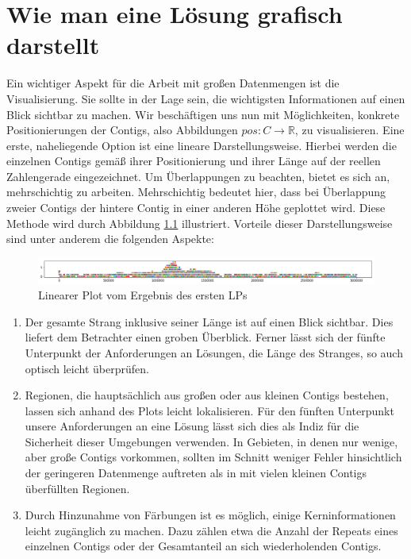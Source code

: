 \chapter{Wie man eine Lösung grafisch darstellt}
Ein wichtiger Aspekt für die Arbeit mit großen Datenmengen ist die Visualisierung.
Sie sollte in der Lage sein, die wichtigsten Informationen auf einen Blick sichtbar zu machen. Wir beschäftigen uns nun mit Möglichkeiten, konkrete Positionierungen der Contigs, also Abbildungen $pos: C \rightarrow \mathbb{R}$, zu visualisieren.
Eine erste, naheliegende Option ist eine lineare Darstellungsweise. Hierbei werden die einzelnen Contigs gemäß ihrer Positionierung und ihrer Länge auf der reellen Zahlengerade eingezeichnet. Um Überlappungen zu beachten, bietet es sich an, mehrschichtig zu arbeiten. Mehrschichtig bedeutet hier, dass bei Überlappung zweier Contigs der hintere Contig in einer anderen Höhe geplottet wird. Diese Methode wird durch Abbildung \ref{plot1} illustriert.
Vorteile dieser Darstellungsweise sind unter anderem die folgenden Aspekte:
\begin{figure}
	\begin{center}
		\includegraphics[width=17cm]{bilder/plot1}
	\end{center}
	\caption{Linearer Plot vom Ergebnis des ersten LPs}
	\label{plot1}
\end{figure}
\begin{enumerate}
	\item Der gesamte Strang inklusive seiner Länge ist auf einen Blick sichtbar. Dies liefert dem Betrachter einen groben Überblick. Ferner lässt sich der fünfte Unterpunkt der Anforderungen an Lösungen, die Länge des Stranges, so auch optisch leicht überprüfen.
	\item Regionen, die hauptsächlich aus großen oder aus kleinen Contigs bestehen, lassen sich anhand des Plots leicht lokalisieren. Für den fünften Unterpunkt unsere Anforderungen an eine Lösung lässt sich dies als Indiz für die Sicherheit dieser Umgebungen verwenden. In Gebieten, in denen nur wenige, aber große Contigs vorkommen, sollten im Schnitt weniger Fehler hinsichtlich der geringeren Datenmenge auftreten als in mit vielen kleinen Contigs überfüllten Regionen.
	\item Durch Hinzunahme von Färbungen ist es möglich, einige Kerninformationen leicht zugänglich zu machen. Dazu zählen etwa die Anzahl der Repeats eines einzelnen Contigs oder der Gesamtanteil an sich wiederholenden Contigs.
\end{enumerate}
